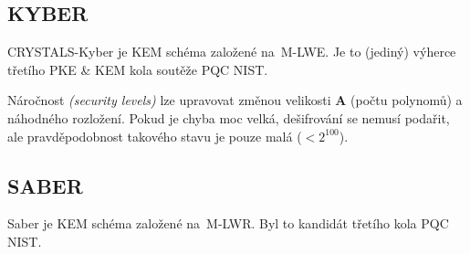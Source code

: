 \subsection{KYBER}

CRYSTALS-Kyber je KEM schéma založené na~M-LWE.
Je to (jediný) výherce třetího PKE \& KEM kola soutěže PQC NIST.

Náročnost \emph{(security levels)} lze upravovat změnou velikosti \textbf{A} (počtu polynomů) a náhodného rozložení.
Pokud je chyba moc velká, dešifrování se nemusí podařit, ale pravděpodobnost takového stavu je pouze malá ($< 2^{100}$).

\subsection{SABER}

Saber je KEM schéma založené na~M-LWR.
Byl to kandidát třetího kola PQC NIST.

